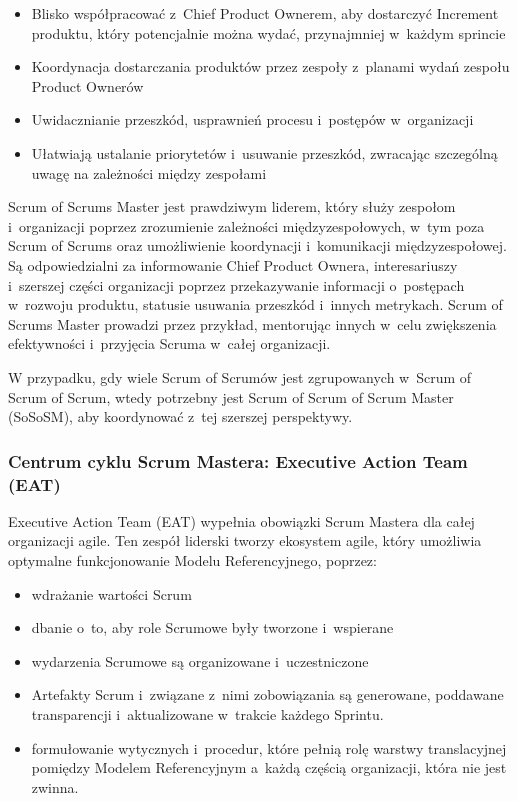 \documentclass[12pt,a4paper,parskip=full]{scrartcl}
\begin{document}
\begin{itemize}
\itemsep1pt\parskip0pt
\item
  Blisko współpracować z~Chief Product Ownerem, aby dostarczyć Increment produktu, który potencjalnie można wydać, przynajmniej w~każdym sprincie
\item
  Koordynacja dostarczania produktów przez zespoły z~planami wydań zespołu Product Ownerów
\item
  Uwidacznianie przeszkód, usprawnień procesu i~postępów w~organizacji
\item
  Ułatwiają ustalanie priorytetów i~usuwanie przeszkód, zwracając szczególną uwa\-gę na zależności między zespołami
\end{itemize}

Scrum of Scrums Master jest prawdziwym liderem, który służy zespołom i~organizacji poprzez zrozumienie zależności międzyzespołowych, w~tym poza Scrum of Scrums oraz umożliwienie koordynacji i~komunikacji międzyzespołowej. Są odpowiedzialni za informowanie Chief Product Ownera, interesariuszy i~szerszej części organizacji poprzez przekazywanie informacji o~postępach w~rozwoju produktu, statusie usuwania przeszkód i~innych metrykach. Scrum of Scrums Master prowadzi przez przykład, mentorując innych w~celu zwiększenia efektywności i~przyjęcia Scruma w~całej organizacji.

W przypadku, gdy wiele Scrum of Scrumów jest zgrupowanych w~Scrum of Scrum of Scrum, wtedy potrzebny jest Scrum of Scrum of Scrum Master (SoSoSM), aby koordynować z~tej szerszej perspektywy.

\subsubsection{Centrum cyklu Scrum Mastera: Executive Action Team (EAT)}\label{the-hub-of-the-sm-cycle}

Executive Action Team (EAT) wypełnia obowiązki Scrum Mastera dla całej organizacji agile. Ten zespół liderski tworzy ekosystem agile, który umożliwia optymalne funkcjonowanie Modelu Referencyjnego, poprzez:

\begin{itemize}
\itemsep1pt\parskip0pt
\item
  wdrażanie wartości Scrum
\item
  dbanie o~to, aby role Scrumowe były tworzone i~wspierane
\item
  wydarzenia Scrumowe są organizowane i~uczestniczone
\item
  Artefakty Scrum i~związane z~nimi zobowiązania są generowane, poddawane transparencji i~aktualizowane w~trakcie każdego Sprintu.
\item
 formułowanie wytycznych i~procedur, które pełnią rolę warstwy translacyjnej pomiędzy Modelem Referencyjnym a~każdą częścią organizacji, która nie jest zwinna.
\end{itemize}
\end{document}
